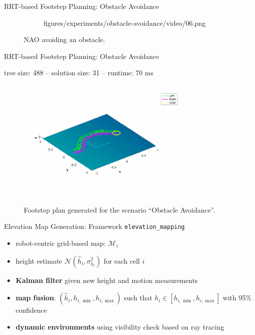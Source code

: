 \documentclass[10pt]{beamer}
\begin{document}
\begin{frame}{RRT-based Footstep Planning: Obstacle Avoidance}
\begin{figure}
\begin{subfigure}{0.40\textwidth}
				{figures/experiments/obstacle-avoidance/video/06.png}
		\end{subfigure}
		\caption{NAO avoiding an obstacle.}
	\end{figure}
\end{frame}

\begin{frame}{RRT-based Footstep Planning: Obstacle Avoidance}
	\begin{center}
    tree size: 488 -- solution size: 31 -- runtime: 70 ms
  \end{center}
	\begin{figure}
		\centering
		\includegraphics[width=0.8\textwidth]
				{figures/experiments/obstacle-avoidance/footstep-plan.pdf}
		\caption{Footstep plan generated for the scenario ``Obstacle Avoidance''.}
	\end{figure}
\end{frame}

\begin{frame}{Elevation Map Generation: Framework}
	\texttt{elevation\_mapping}
  \begin{itemize}
		\item robot-centric grid-based map: $\mathcal{M}_z$
		\item height estimate $\mathcal{N}(\hat{h}_i, \sigma_{h_i}^2)$
				for each cell $i$
		\item \textbf{Kalman filter} given new height and motion measurements
		\item \textbf{map fusion}: $(\hat{h}_i, h_{i,\min}, h_{i,\max})$ such that
				$h_i \in [h_{i,\min}, h_{i,\max}]$ with 95\% confidence
		\item \textbf{dynamic environments} using visibility check based
				on ray tracing
	\end{itemize}
\end{frame}
\end{document}

